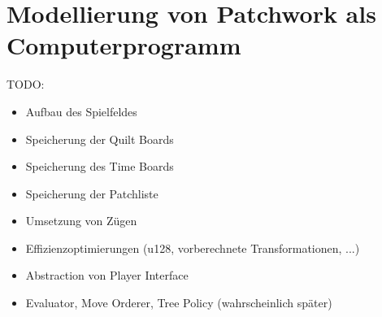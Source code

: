 \chapter{Modellierung von Patchwork als Computerprogramm}
\label{chapter:modellierung-von-patchwork-als-computerprogramm}

TODO:

\begin{itemize}
    \item Aufbau des Spielfeldes
    \item Speicherung der Quilt Boards
    \item Speicherung des Time Boards
    \item Speicherung der Patchliste
    \item Umsetzung von Zügen
    \item Effizienzoptimierungen (u128, vorberechnete Transformationen, ...)
    \item Abstraction von Player Interface
    \item Evaluator, Move Orderer, Tree Policy (wahrscheinlich später)
\end{itemize}